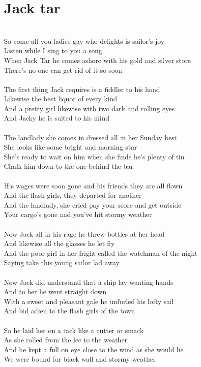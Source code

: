 \documentclass[letterpaper,9pt]{article}
\begin{document}
\section{Jack tar}
\noindent
\\So come all you ladies gay who delights is sailor’s joy
\\Listen while I sing to you a song
\\When Jack Tar he comes ashore with his gold and silver store
\\There’s no one can get rid of it so soon
\\
\\The first thing Jack requires is a fiddler to his hand
\\Likewise the best liquor of every kind
\\And a pretty girl likewise with two dark and rolling eyes
\\And Jacky he is suited to his mind
\\
\\The landlady she comes in dressed all in her Sunday best
\\She looks like some bright and morning star
\\She’s ready to wait on him when she finds he’s plenty of tin
\\Chalk him down to the one behind the bar
\\
\\His wages were soon gone and his friends they are all flown
\\And the flash girls, they departed for another
\\And the landlady, she cried pay your score and get outside
\\Your cargo’s gone and you’ve hit stormy weather
\\
\\Now Jack all in his rage he threw bottles at her head
\\And likewise all the glasses he let fly
\\And the poor girl in her fright called the watchman of the night
\\Saying take this young sailor lad away
\\
\\Now Jack did understand that a ship lay wanting hands
\\And to her he went straight down
\\With a sweet and pleasant gale he unfurled his lofty sail
\\And bid adieu to the flash girls of the town
\\
\\So he laid her on a tack like a cutter or smack
\\As she rolled from the lee to the weather
\\And he kept a full on eye close to the wind as she would lie
\\We were bound for black wall and stormy weather
\end{document}
